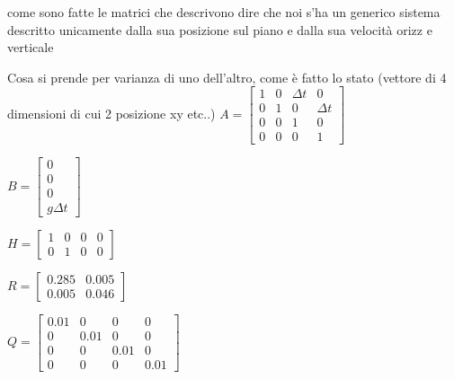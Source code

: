 come sono fatte le matrici che descrivono 
dire che noi s'ha un generico sistema descritto unicamente dalla sua posizione sul piano e dalla sua velocità orizz e verticale

Cosa si prende per varianza di uno dell'altro, come è fatto lo stato (vettore di 4 dimensioni di cui 2 posizione xy etc..)
$ A = 
\begin{bmatrix}
 1 & 0 & \Delta t & 0 \\
 0 & 1 & 0 & \Delta t \\
 0 & 0 & 1 & 0 \\
 0 & 0 & 0 & 1
\end{bmatrix}
$

$ B =\begin{bmatrix} 0 \\ 0 \\ 0 \\ g \Delta t \end{bmatrix}$

$ H = \begin{bmatrix} 
1 & 0 & 0 & 0\\
0 & 1 & 0 & 0
\end{bmatrix} $

$ R = \begin{bmatrix} 
0.285 & 0.005\\
0.005 & 0.046
\end{bmatrix} $

$ Q = \begin{bmatrix} 
0.01 & 0 & 0 & 0\\
0 & 0.01 & 0 & 0\\
0 & 0 & 0.01 & 0\\
0 & 0 & 0 & 0.01
\end{bmatrix} $

